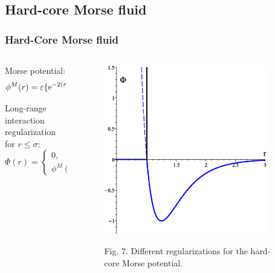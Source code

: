 \documentclass[8pt]{beamer}
\begin{document}
	\subsection{Hard-core Morse fluid}
	
	\begin{frame}
		\frametitle{Hard-Core Morse fluid}
		
		\begin{columns}
			\begin{column}{0.5\textwidth}
				Morse potential:
				\begin{equation*}
					\phi^M(r) = \varepsilon \{{\rm e}^{-2(r-R_0)/\alpha}-2{\rm e}^{-(r-R_0)/\alpha}\}.
				\end{equation*}
				
				Long-range interaction regularization for $r \leq \sigma$:
				\begin{equation*}
					\Phi(r) = \left\{
					\begin{array}{ll}
						0, & r \leq \sigma 
						\\
						\phi^M(r), & r > \sigma.
					\end{array}
					\right.
				\end{equation*}
								
			\end{column}
			
			\begin{column}{0.5\textwidth}
				\begin{figure}[htbp]
					\includegraphics[width=0.9\textwidth,angle=0]{hcmorse} \\
					\parbox{0.8\textwidth}{\caption*{Fig. 7. Different regularizations for the hard-core Morse potential.
					}}
				\end{figure}
				
			\end{column}
		\end{columns}
		
	\end{frame}
	
\end{document}
